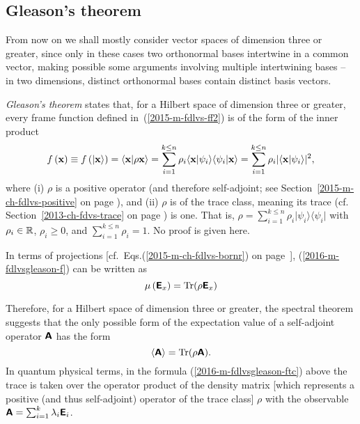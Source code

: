 \subsection{Gleason's theorem}
\label{Gleasontheorem}

From now on we shall mostly consider vector spaces of dimension three or greater,
since only in these cases two  orthonormal bases intertwine in a common vector, making possible
some arguments involving multiple intertwining bases  -- in two dimensions,
distinct orthonormal bases contain distinct basis vectors.


{\em Gleason's theorem} \cite{Gleason,r:dvur-93,pitowsky:218,rich-bridge,peres,hamhalter-book}
states that,
for a Hilbert space of dimension three or greater,
every frame function defined in~(\ref{2015-m-fdlvs-ff2})
is of the form  of the inner product
\begin{equation}
f \left(   {\bf x}   \right)
\equiv
f \left( \vert {\bf x} \rangle \right)
=
\langle {\bf x}  \vert \rho {\bf x} \rangle
=
\sum_{i=1}^{k\le n} \rho_i
\langle {\bf x}  \vert \psi_i\rangle \langle \psi_i \vert {\bf x} \rangle
=
\sum_{i=1}^{k\le n} \rho_i
\vert \langle {\bf x}  \vert \psi_i\rangle \vert^2
,
\label{2016-m-fdlvsgleason-f}
\end{equation}
where
(i) $\rho $
is a positive operator (and therefore self-adjoint;
see Section~\ref{2015-m-ch-fdlvs-positive} on page \pageref{2015-m-ch-fdlvs-positive}),
and
(ii) $\rho $ is
of the trace class,
meaning its trace (cf. Section~\ref{2013-ch-fdvs-trace} on page \pageref{2013-ch-fdvs-trace}) is one.
That is, $\rho=
\sum_{i=1}^{k\le n} \rho_i \vert \psi_i \rangle \langle \psi_i \vert$
with $\rho_i \in {\Bbb R}$, $\rho_i \ge 0$, and $\sum_{i=1}^{k\le n} \rho_i =1$.
No proof is given here.

In terms of projections [cf.~Eqs.(\ref{2015-m-ch-fdlvs-bornr}) on page~\pageref{2015-m-ch-fdlvs-bornr}],
(\ref{2016-m-fdlvsgleason-f}) can be written as
\begin{equation}
\mu \left( \textsf{\textbf{E}}_x \right)
=
{\rm Tr}( \rho  \textsf{\textbf{E}}_x )
\label{2016-m-fdlvsgleason-fproj}
\end{equation}



Therefore, for a Hilbert space of dimension three or greater, the  spectral theorem suggests that
the only possible form of the  expectation value
of a self-adjoint operator  $\textsf{\textbf{A}}$
has the form
\begin{equation}
\langle
\textsf{\textbf{A}}
\rangle
=
\textrm{Tr}({  \rho} \textsf{\textbf{A}}).
\label{2016-m-fdlvsgleason-ftc}
\end{equation}
In quantum physical terms, in the formula (\ref{2016-m-fdlvsgleason-ftc}) above
the trace is taken over
the operator product of the  density matrix [which represents a positive (and thus self-adjoint) operator of the trace class]
${  \rho}$
with the observable $\textsf{\textbf{A}}=\sum_{i=1}^k \lambda_i \textsf{\textbf{E}}_i $.

